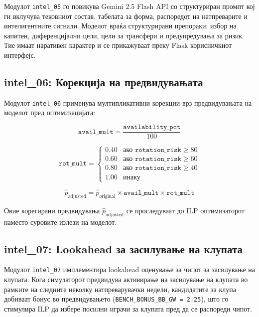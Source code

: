 Модулот \texttt{intel\_05} го повикува Gemini 2.5 Flash API со структуриран промпт кој ги вклучува тековниот состав, табелата за форма, распоредот на натпреварите и интелигентните сигнали. Моделот враќа структурирани препораки: избор на капитен, диференцијални цели, цели за трансфери и предупредувања за ризик. Тие имаат наративен карактер и се прикажуваат преку Flask корисничкиот интерфејс.

\subsection{intel\_06: Корекција на предвидувањата}

Модулот \texttt{intel\_06} применува мултипликативни корекции врз предвидувањата на моделот пред оптимизацијата:

\begin{equation}
\texttt{avail\_mult} = \frac{\texttt{availability\_pct}}{100}
\end{equation}

\begin{equation}
\texttt{rot\_mult} = \begin{cases}
0.40 & \text{ако } \texttt{rotation\_risk} \geq 80 \\
0.60 & \text{ако } \texttt{rotation\_risk} \geq 60 \\
0.80 & \text{ако } \texttt{rotation\_risk} \geq 40 \\
1.00 & \text{инаку}
\end{cases}
\end{equation}

\begin{equation}
\hat{p}_{\text{adjusted}} = \hat{p}_{\text{original}} \times \texttt{avail\_mult} \times \texttt{rot\_mult}
\end{equation}

Овие корегирани предвидувања $\hat{p}_{\text{adjusted}}$ се проследуваат до ILP оптимизаторот наместо суровите излези на моделот.

\subsection{intel\_07: Lookahead за засилување на клупата}

Модулот \texttt{intel\_07} имплементира lookahead оценување за чипот за засилување на клупата. Кога симулаторот предвидува активирање на засилување на клупата во рамките на следните неколку натпреварувачки недели, кандидатите за клупа добиваат бонус во предвидувањето (\texttt{BENCH\_BONUS\_BB\_GW = 2.25}), што го стимулира ILP да избере посилни играчи за клупата пред да се распореди чипот.

